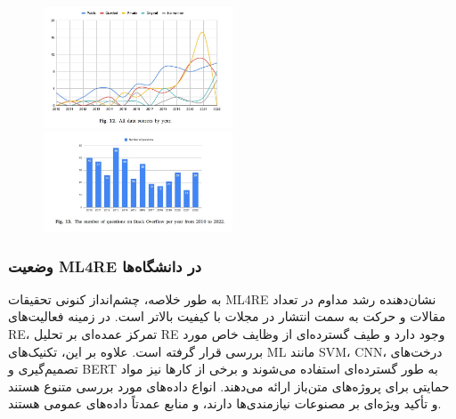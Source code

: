 \documentclass[a4paper,10pt]{article}
\begin{document}
                \begin{figure}
                    \centering
                    \includegraphics[width=0.5\textwidth]{Image/fig-12.jpg}
                    \includegraphics[width=0.5\textwidth]{Image/fig-13.jpg}
                \end{figure}

            \subsubsection{وضعیت ML4RE در دانشگاه‌ها}

                به طور خلاصه، چشم‌انداز کنونی تحقیقات ML4RE نشان‌دهنده رشد مداوم در تعداد مقالات و حرکت به سمت انتشار در مجلات با کیفیت بالاتر است. در زمینه فعالیت‌های RE، تمرکز عمده‌ای بر تحلیل RE وجود دارد و طیف گسترده‌ای از وظایف خاص مورد بررسی قرار گرفته است. علاوه بر این، تکنیک‌های ML مانند SVM، CNN، درخت‌های تصمیم‌گیری و BERT به طور گسترده‌ای استفاده می‌شوند و برخی از کارها نیز مواد حمایتی برای پروژه‌های متن‌باز ارائه می‌دهند. انواع داده‌های مورد بررسی متنوع هستند و تأکید ویژه‌ای بر مصنوعات نیازمندی‌ها دارند، و منابع عمدتاً داده‌های عمومی هستند.
\end{document}
